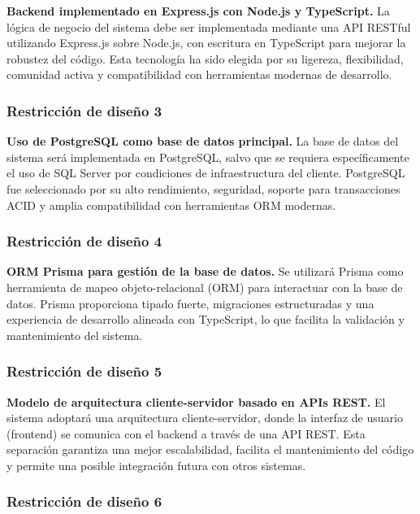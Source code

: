 \textbf{Backend implementado en Express.js con Node.js y TypeScript.}
La lógica de negocio del sistema debe ser implementada mediante una API RESTful utilizando Express.js sobre Node.js, con escritura en TypeScript para mejorar la robustez del código. Esta tecnología ha sido elegida por su ligereza, flexibilidad, comunidad activa y compatibilidad con herramientas modernas de desarrollo.

\subsubsection*{Restricción de diseño 3}

\textbf{Uso de PostgreSQL como base de datos principal.}
La base de datos del sistema será implementada en PostgreSQL, salvo que se requiera específicamente el uso de SQL Server por condiciones de infraestructura del cliente. PostgreSQL fue seleccionado por su alto rendimiento, seguridad, soporte para transacciones ACID y amplia compatibilidad con herramientas ORM modernas.

\subsubsection*{Restricción de diseño 4}

\textbf{ORM Prisma para gestión de la base de datos.}
Se utilizará Prisma como herramienta de mapeo objeto-relacional (ORM) para interactuar con la base de datos. Prisma proporciona tipado fuerte, migraciones estructuradas y una experiencia de desarrollo alineada con TypeScript, lo que facilita la validación y mantenimiento del sistema.

\subsubsection*{Restricción de diseño 5}

\textbf{Modelo de arquitectura cliente-servidor basado en APIs REST.}
El sistema adoptará una arquitectura cliente-servidor, donde la interfaz de usuario (frontend) se comunica con el backend a través de una API REST. Esta separación garantiza una mejor escalabilidad, facilita el mantenimiento del código y permite una posible integración futura con otros sistemas.

\subsubsection*{Restricción de diseño 6}

